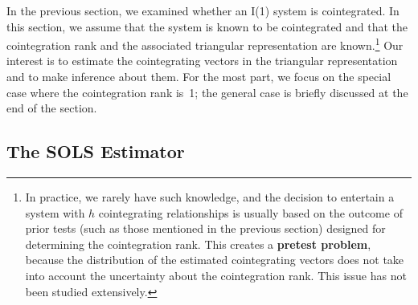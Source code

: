 
In the previous section, we examined whether an I(1) system is cointegrated. In
this section, we assume that the system is known to be cointegrated and that the
cointegration rank and the associated triangular representation are known.\footnote{%
In practice, we rarely have such knowledge, and the decision to entertain a system with $h$ cointegrating
relationships is usually based on the outcome of prior tests (such as those mentioned in the previous section)
designed for determining the cointegration rank. This creates a \textbf{pretest problem}, because the distribution of the
estimated cointegrating vectors does not take into account the uncertainty about the cointegration rank. This issue
has not been studied extensively.}
Our
interest is to estimate the cointegrating vectors in the triangular representation and
to make inference about them. For the most part, we focus on the special case
where the cointegration rank is~1; the general case is briefly discussed at the end of
the section.

\subsection*{The SOLS Estimator}

